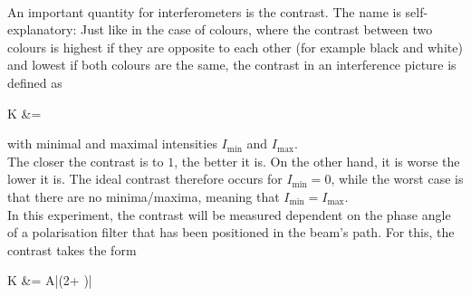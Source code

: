 \\
An important quantity for interferometers is the contrast. The name is self-explanatory: Just like in the case of colours, where the contrast between two colours is highest if they are opposite to each other (for example black and white) and lowest if both colours are the same, the contrast in an interference picture is defined as 
\begin{aquation}
  K &=  \tc
  \label{eq:contrast}
\end{aquation}
with minimal and maximal intensities $I_\text{min}$ and $I_\text{max}$.\\
The closer the contrast is to $1$, the better it is. On the other hand, it is worse the lower it is. The ideal contrast therefore occurs for $I_\text{min}=0$, while the worst case is that there are no minima/maxima, meaning that $I_\text{min}=I_\text{max}$.\\
In this experiment, the contrast will be measured dependent on the phase angle of a polarisation filter that has been positioned in the beam's path. For this, the contrast takes the form 
\begin{aquation}
K &= A|\sin(2\varphi + \delta)| \tp
\end{aquation}

